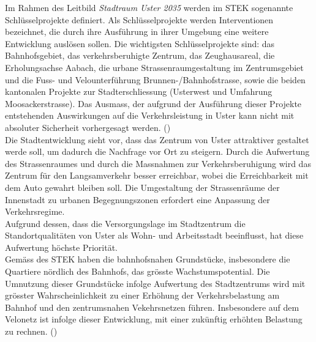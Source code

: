 Im Rahmen des Leitbild \textit{Stadtraum Uster 2035} werden im STEK sogenannte Schlüsselprojekte definiert. Als Schlüsselprojekte werden Interventionen bezeichnet, die durch ihre Ausführung in ihrer Umgebung eine weitere Entwicklung auslösen sollen. Die wichtigsten Schlüsselprojekte sind: das Bahnhofsgebiet, das verkehrsberuhigte Zentrum, das Zeughausareal, die Erholungsachse Aabach, die urbane Strassenraumgestaltung im Zentrumsgebiet und die Fuss- und Velounterführung Brunnen-/Bahnhofstrasse, sowie die beiden kantonalen Projekte zur Stadterschliessung (Usterwest und Umfahrung Moosackerstrasse). Das Ausmass, der aufgrund der Ausführung dieser Projekte entstehenden Auswirkungen auf die Verkehrsleistung in Uster kann nicht mit absoluter Sicherheit vorhergesagt werden. (\cite{STEK}) \\

Die Stadtentwicklung sieht vor, dass das Zentrum von Uster attraktiver gestaltet werde soll, um dadurch die Nachfrage vor Ort zu steigern. Durch die Aufwertung des Strassenraumes und durch die Massnahmen zur Verkehrsberuhigung wird das Zentrum für den Langsamverkehr besser erreichbar, wobei die Erreichbarkeit mit dem Auto gewahrt bleiben soll. Die Umgestaltung der Strassenräume der Innenstadt zu urbanen Begegnungszonen erfordert eine Anpassung der Verkehrsregime. \\
Aufgrund dessen, dass die Versorgungslage im Stadtzentrum die Standortqualitäten von Uster als Wohn- und Arbeitsstadt beeinflusst, hat diese Aufwertung höchste Priorität. \\
Gemäss des STEK haben die bahnhofsnahen Grundstücke, insbesondere die Quartiere nördlich des Bahnhofs, das grösste Wachstumspotential. Die Umnutzung dieser Grundstücke infolge Aufwertung des Stadtzentrums wird mit grösster Wahrscheinlichkeit zu einer Erhöhung der Verkehrsbelastung am Bahnhof und den zentrumsnahen Vekehrsnetzen führen. Insbesondere auf dem Velonetz ist infolge dieser Entwicklung, mit einer zukünftig erhöhten Belastung zu rechnen. 
(\cite{STEK})

\pagebreak

